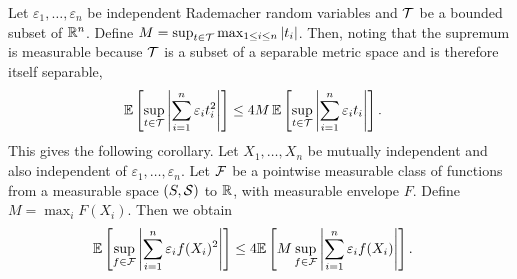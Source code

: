 \begin{lemma}
  \label{lem:kernel_app_contraction}

  Let $\varepsilon_1, \ldots, \varepsilon_n$
  be independent Rademacher random variables
  and $\mathcal{T}$ be a bounded subset of $\mathbb{R}^n$.
  Define
  $M = \sup_{t \in \mathcal{T}} \max_{1 \leq i \leq n} |t_i|$.
  Then, noting that the supremum is measurable
  because $\mathcal{T}$ is a subset of a separable metric space
  and is therefore itself separable,
  \begin{align*}
    \mathbb{E}
    \left[
      \sup_{t \in \mathcal{T}}
      \left|
      \sum_{i=1}^n
      \varepsilon_i
      t_i^2
      \right|
    \right]
    &\leq
    4M \,
    \mathbb{E}
    \left[
      \sup_{t \in \mathcal{T}}
      \left|
      \sum_{i=1}^n
      \varepsilon_i
      t_i
      \right|
    \right].
  \end{align*}
  This gives the following corollary.
  Let $X_1, \ldots, X_n$ be mutually independent
  and also independent of $\varepsilon_1, \ldots, \varepsilon_n$.
  Let $\mathcal{F}$ be a pointwise measurable class of functions
  from a measurable space $(S, \mathcal{S})$ to $\mathbb{R}$,
  with measurable envelope $F$.
  Define $M = \max_i F(X_i)$.
  Then we obtain
  \begin{align*}
    \mathbb{E}
    \left[
      \sup_{f \in \mathcal{F}}
      \left|
      \sum_{i=1}^n
      \varepsilon_i
      f(X_i)^2
      \right|
    \right]
    &\leq
    4
    \mathbb{E}
    \left[
      M
      \sup_{f \in \mathcal{F}}
      \left|
      \sum_{i=1}^n
      \varepsilon_i
      f(X_i)
      \right|
    \right].
  \end{align*}

\end{lemma}

